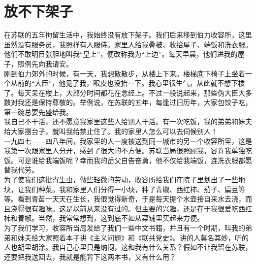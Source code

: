 \fancyhead[RO]{\thepage} %
\fancyhead[LE]{\thepage} %
\chapter*{放不下架子}
在苏联的五年拘留生活中，我始终没有放下架子。我们后来移到伯力收容所，这里虽然没有服务员，我照样有人服侍。家里人给我叠被、收拾屋子、端饭和洗衣服。他们不敢明目张胆地叫我“皇上”，便改称我为“上边”。每天早晨，他们进我的屋子，照例先向我请安。\\

刚到伯力郊外的时候，有一天，我想散散步，从楼上下来。楼梯底下椅子上坐着一个从前的“大臣”，他见了我，眼皮也没抬一下。我心里很生气，从此就不想下楼了。每天呆在楼上，大部分时间都花在念经上。不过一般说起来，那些伪大臣大多数对我还是保持尊敬的。举例说，在苏联的五年，每逢过旧历年，大家包饺子吃，第一碗总要先盛给我。\\

我自己不干活，还不愿意我家里这些人给别人干活。有一次吃饭，我的弟弟和妹夫给大家摆台子，就叫我给禁止住了。我的家里人怎么可以去伺候别人！\\

一九四七——四八年间，我家里的人一度被送到同一城市的另一个收容所里，这是我第一次跟家里人分开，感到了很大的不方便。苏联当局很照顾我，容许我单独吃饭。可是谁给我端饭呢？幸而我的岳父自告奋勇，他不仅给我端饭，连洗衣服都愿替我代劳。\\

为了使我们这批寄生虫，做些轻微的劳动，收容所给我们在院子里划出了一些地块，让我们种菜。我和家里人们分得一小块，种了青椒、西红柿、茄子、扁豆等等。看到青苗一天天在生长，我很觉得新奇，于是每天提个水壶接自来水去浇，而且浇得很有趣味。这是以前从来没有过的。但主要的兴趣，还是在于我很爱吃西红柿和青椒。当然，我常常想到，这到底不如从菜铺里买起来方便。\\

为了我们学习，收容所当局发给了我们一些中文书籍，并且有一个时期，叫我的弟弟和妹夫给大家照着本子讲《主义问题》和《联共党史》。讲的人莫名其妙，听的人也胡里胡涂。我自己心里只是纳闷，这和我有什么关系？假如不让我留在苏联，还要把我送回去，我就是能背下这两本书，又有什么用？\\


